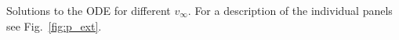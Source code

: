 Solutions to the ODE for different $v_\infty$. For a description of the individual panels see Fig.~\ref{fig:p_ext}.
